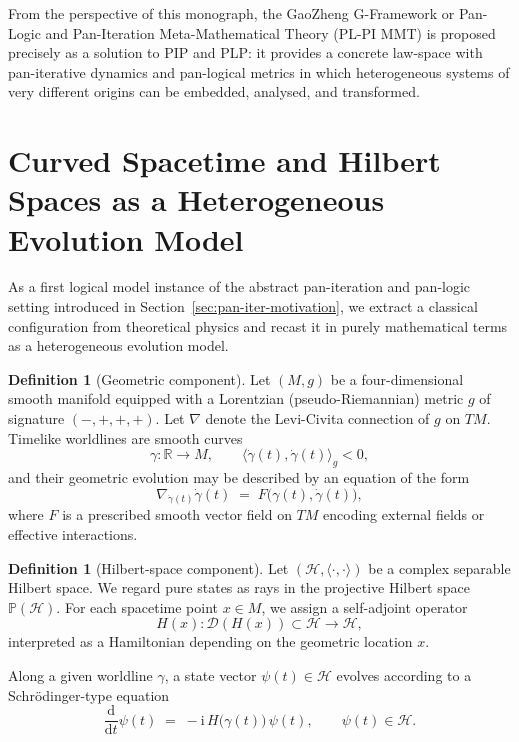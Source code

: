 \documentclass[11pt]{book}
\theoremstyle{plain}
\theoremstyle{definition}
\newtheorem{definition}[theorem]{Definition} \theoremstyle{remark}
\begin{document}
From the perspective of this monograph, the GaoZheng G-Framework or
Pan-Logic and Pan-Iteration Meta-Mathematical Theory (PL-PI MMT) is
proposed precisely as a solution to PIP and PLP: it provides a concrete
law-space with pan-iterative dynamics and pan-logical metrics in which
heterogeneous systems of very different origins can be embedded,
analysed, and transformed.



\section{Curved Spacetime and Hilbert Spaces as a Heterogeneous Evolution Model}


As a first logical model instance of the abstract pan-iteration and
pan-logic setting introduced in Section~\ref{sec:pan-iter-motivation},
we extract a classical configuration from theoretical physics and
recast it in purely mathematical terms as a heterogeneous evolution
model.

\begin{definition}[Geometric component]
Let $(M,g)$ be a four-dimensional smooth manifold equipped with a
Lorentzian (pseudo-Riemannian) metric $g$ of signature $(-,+,+,+)$.
Let $\nabla$ denote the Levi-Civita connection of $g$ on $TM$. Timelike
worldlines are smooth curves
\[
  \gamma:\mathbb{R}\to M,\qquad
  \langle \dot\gamma(t),\dot\gamma(t)\rangle_g < 0,
\]
and their geometric evolution may be described by an equation of the
form
\[
  \nabla_{\dot\gamma(t)}\dot\gamma(t)
  \;=\; F\big(\gamma(t),\dot\gamma(t)\big),
\]
where $F$ is a prescribed smooth vector field on $TM$ encoding external
fields or effective interactions.
\end{definition}



\begin{definition}[Hilbert-space component]
Let $(\mathcal{H},\langle\cdot,\cdot\rangle)$ be a complex separable
Hilbert space. We regard pure states as rays in the projective Hilbert
space $\mathbb{P}(\mathcal{H})$. For each spacetime point $x\in M$, we
assign a self-adjoint operator
\[
  H(x):\mathcal{D}(H(x))\subset\mathcal{H}\to\mathcal{H},
\]
interpreted as a Hamiltonian depending on the geometric location $x$.

Along a given worldline $\gamma$, a state vector $\psi(t)\in
\mathcal{H}$ evolves according to a Schr\"odinger-type equation
\[
  \frac{\mathrm{d}}{\mathrm{d}t}\psi(t)
  \;=\;
  -\mathrm{i}\,H\big(\gamma(t)\big)\,\psi(t),
  \qquad \psi(t)\in\mathcal{H}.
\]
\end{definition}
\end{document}
